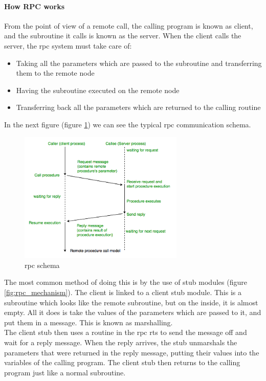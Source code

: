 \paragraph{How RPC works}
From the point of view of a remote call, the calling program is known as client, and the subroutine it calls is known as the server\cite{rpcInOS,howRPC}. When the client calls the server, the \acrshort{rpc} system must take care of:
\begin{itemize}
    \item Taking all the parameters which are passed to the subroutine and transferring them to the remote node
    \item Having the subroutine executed on the remote node
    \item Transferring back all the parameters which are returned to the calling routine
\end{itemize}

In the next figure (figure \ref{fig:rpc_schema}) we can see the typical \acrshort{rpc} communication schema.
\begin{figure}[h]
    \centering
    \includegraphics[width=0.7\textwidth]{images/State of the Art/json-rpc/rpc.png}
    \caption{\acrshort{rpc} schema}
    \label{fig:rpc_schema}
\end{figure}
The most common method of doing this is by the use of stub modules (figure \ref{fig:rpc_mechanism}). The client is linked to a client stub module. This is a subroutine which looks like the remote subroutine, but on the inside, it is almost empty. All it does is take the values of the parameters which are passed to it, and put them in a message. This is known as marshalling.\\

The client stub then uses a routine in the \acrshort{rpc} \acrfull{rts} to send the message off and wait for a reply message. When the reply arrives, the stub unmarshals the parameters that were returned in the reply message, putting their values into the variables of the calling program. The client stub then returns to the calling program just like a normal subroutine.\\

